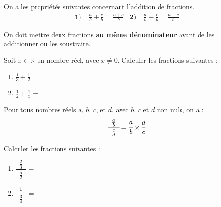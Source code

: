 \documentclass[11pt]{article}
\begin{document}
\begin{prop}
  On a les propriétés suivantes concernant l'addition de fractions.
  \begin{align*}
    \textbf{1)}\;& \frac{a}{b}+\frac{c}{b} = \frac{a+c}{b} &
    \textbf{2)}\;& \frac{a}{b}-\frac{c}{b}= \frac{a-c}{b}
  \end{align*}
\end{prop}
\begin{rmq}
  On doit mettre deux fractions \textbf{au même dénominateur} avant de
  les additionner ou les soustraire.
\end{rmq}
\begin{exemple}
  Soit $x\in\mathbb{R}$ un nombre réel, avec $x\neq0$. Calculer les fractions suivantes :
 \begin{enumerate}
   \item $\frac{1}{3}+\frac{1}{2} = $
   \item $\frac{1}{2}+\frac{1}{x} = $
 \end{enumerate}
\end{exemple}
\begin{prop}
  Pour tous nombres réels $a$, $b$, $c$, et $d$, avec $b$, $c$ et $d$ non nuls,
  on a :
  \[
    \cfrac{\phantom{1}\frac{a}{b}\phantom{1}}{\frac{c}{d}} =
    \cfrac{a}{b}\times\frac{d}{c}
  \]
\end{prop}
\begin{exemple}
  Calculer les fractions suivantes :
  \begin{enumerate}
    \item $\dfrac{\phantom{1}\frac{2}{3}\phantom{1}}{\frac{5}{2}} = $
    \item $\dfrac{\phantom{1}1\phantom{1}}{\frac{3}{4}} = $
  \end{enumerate}
\end{exemple}
\end{document}
